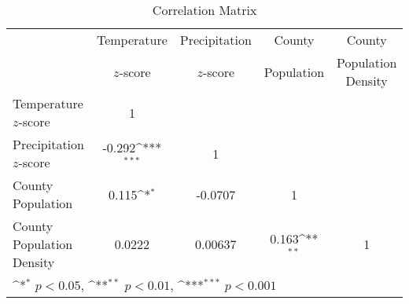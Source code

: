 \begin{table}[htbp]\centering\label{table:correlation-matrix}
\def\sym#1{\ifmmode^{#1}\else\(^{#1}\)\fi}
\caption{Correlation Matrix}
\begin{tabular}{l*{4}{c}}
\hline\hline
          & Temperature        &Precipitation        &County       &County       \\
          & $z$-score        &$z$-score         &Population         &Population Density         \\
\hline
Temperature $z$-score  &        1         &                  &                  &                  \\
Precipitation $z$-score &   -0.292\sym{***}&        1         &                  &                  \\
County Population&    0.115\sym{*}  &  -0.0707         &        1         &                  \\
County Population Density&   0.0222         &  0.00637         &    0.163\sym{**} &        1         \\
\hline\hline
\multicolumn{5}{l}{\footnotesize \sym{*} \(p<0.05\), \sym{**} \(p<0.01\), \sym{***} \(p<0.001\)}\\
\end{tabular}
\end{table}

